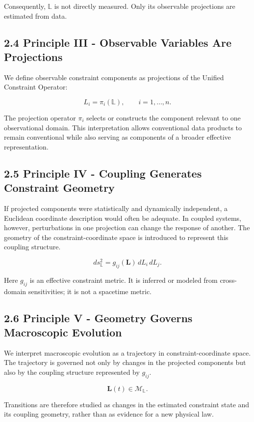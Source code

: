 Consequently, \(\mathbb{L}\) is not directly measured. Only its observable projections are estimated from data.

\subsection{2.4 Principle III - Observable Variables Are Projections}

We define observable constraint components as projections of the Unified Constraint Operator:

\[ L_i = \pi_i(\mathbb{L}), \qquad i=1,\ldots,n. \]

The projection operator \(\pi_i\) selects or constructs the component relevant to one observational domain. This interpretation allows conventional data products to remain conventional while also serving as components of a broader effective representation.

\subsection{2.5 Principle IV - Coupling Generates Constraint Geometry}

If projected components were statistically and dynamically independent, a Euclidean coordinate description would often be adequate. In coupled systems, however, perturbations in one projection can change the response of another. The geometry of the constraint-coordinate space is introduced to represent this coupling structure.

\[ ds_{\mathbb{L}}^2 = g_{ij}(\mathbf{L})\,dL_i\,dL_j. \]

Here \(g_{ij}\) is an effective constraint metric. It is inferred or modeled from cross-domain sensitivities; it is not a spacetime metric.

\subsection{2.6 Principle V - Geometry Governs Macroscopic Evolution}

We interpret macroscopic evolution as a trajectory in constraint-coordinate space. The trajectory is governed not only by changes in the projected components but also by the coupling structure represented by \(g_{ij}\).

\[ \mathbf{L}(t) \in \mathcal{M}_{\mathbb{L}}. \]

Transitions are therefore studied as changes in the estimated constraint state and its coupling geometry, rather than as evidence for a new physical law.

